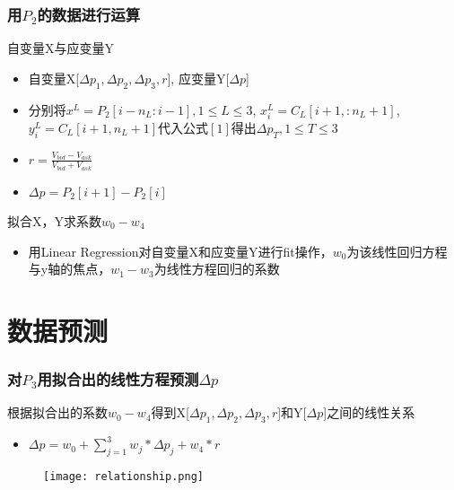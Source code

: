 \documentclass[unknownkeysallowed]{beamer}
\begin{document}
\begin{frame}
  \frametitle{用$P_2$的数据进行运算}
  \begin{block}{自变量X与应变量Y}
    \begin{itemize}
      \item 自变量X[$\Delta p_1, \Delta p_2, \Delta p_3, r$], 应变量Y[$\Delta p$]
      \item 分别将$x^L = P_2[i - n_L: i - 1], 1\leq L\leq 3$, $x^L_i = C_L[i + 1, :n_L + 1]$, $y^L_i = C_L[i + 1, n_L + 1]$代入公式$[1]$得出$\Delta p_T, 1\leq T\leq 3$
      \item $r = \frac{V_{bid} - V_{ask}}{V_{bid} + V_{ask}}\qquad$
      \item $\Delta p = P_2[i + 1] - P_2[i]$
    \end{itemize}
  \end{block}
  \begin{alertblock}{拟合X，Y求系数$w_0 - w_4$}
    \begin{itemize}
     \item 用Linear Regression对自变量X和应变量Y进行fit操作，$w_0$为该线性回归方程与y轴的焦点，$w_1 - w_3$为线性方程回归的系数
    \end{itemize}
    \end{alertblock}
\end{frame}


\section{数据预测}
\begin{frame}
  \frametitle{对$P_3$用拟合出的线性方程预测$\Delta p$}
  \begin{block}{根据拟合出的系数$w_0 - w_4$得到X[$\Delta p_1, \Delta p_2, \Delta p_3, r$]和Y[$\Delta p$]之间的线性关系}
    \begin{itemize}
      \item $\Delta p =w_0+ \sum_{j=1}^{3} w_j*\Delta p_j +w_4*r$
    \end{itemize}
  \end{block}

  \begin{figure}
    \centering
    \texttt{[image: relationship.png]}
  \end{figure}

\end{frame}
\end{document}
